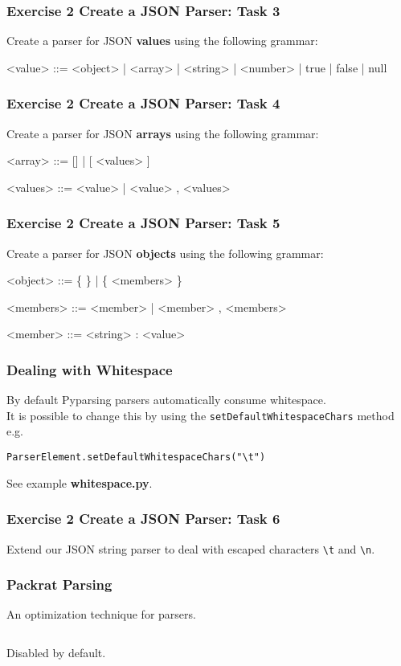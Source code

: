 \documentclass{beamer}
\newcommand*{\escape}[1]{\texttt{\textbackslash#1}}
\begin{document}
\begin{frame}[fragile]
\frametitle{Exercise 2 Create a JSON Parser: Task 3}
Create a parser for JSON \textbf{values} using the following grammar:
\medskip
\begin{grammar}
<value> ::= <object> | <array> | <string> | <number> | true | false | null
\end{grammar}
\end{frame}

\begin{frame}[fragile]
\frametitle{Exercise 2 Create a JSON Parser: Task 4}
Create a parser for JSON \textbf{arrays} using the following grammar:
\medskip
\begin{grammar}
<array> ::= [] | [ <values> ]

<values> ::= <value> | <value> , <values>
\end{grammar}
\end{frame}


\begin{frame}[fragile]
\frametitle{Exercise 2 Create a JSON Parser: Task 5}
Create a parser for JSON \textbf{objects} using the following grammar:
\medskip
\begin{grammar}
<object> ::= \{ \} | \{ <members> \}

<members> ::= <member> | <member> , <members>

<member> ::= <string> : <value>
\end{grammar}
\end{frame}


\begin{frame}[fragile]
\frametitle{Dealing with Whitespace}
By default Pyparsing parsers automatically consume whitespace. \\
\medskip
It is possible to change this by using the \texttt{setDefaultWhitespaceChars} method e.g. \\
\medskip
\begin{verbatim}
ParserElement.setDefaultWhitespaceChars("\t")
\end{verbatim}
\bigskip
See example \textbf{whitespace.py}.

\end{frame}


\begin{frame}[fragile]
\frametitle{Exercise 2 Create a JSON Parser: Task 6}
Extend our JSON string parser to deal with escaped characters \escape{t} and \escape{n}.
\end{frame}


\begin{frame}[fragile]
\frametitle{Packrat Parsing}
An optimization technique for parsers. 

\begin{verbatim}

\end{verbatim}

Disabled by default.
\end{frame}
\end{document}
